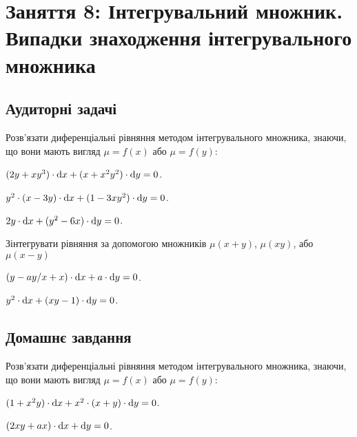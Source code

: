 \section*{Заняття 8: Інтегрувальний множник. Випадки знаходження інтегрувального множника}

\subsection*{Аудиторні задачі}

Розв'язати диференціальні рівняння методом інтегрувального множника, знаючи, що вони мають вигляд $\mu = f(x)$ або $\mu = f(y)$:

\begin{problem}
	$(2 y + x y^3) \cdot \mathop{}\!\mathrm{d} x + (x + x^2 y^2) \cdot \mathop{}\!\mathrm{d} y = 0$.
\end{problem}

\begin{problem}
	$y^2 \cdot (x - 3 y) \cdot \mathop{}\!\mathrm{d} x + (1 - 3 x y^2) \cdot \mathop{}\!\mathrm{d} y = 0$.
\end{problem}

\begin{problem}
	$2 y \cdot \mathop{}\!\mathrm{d} x + (y^2 - 6 x) \cdot \mathop{}\!\mathrm{d} y = 0$.
\end{problem}

Зінтегрувати рівняння за допомогою множників $\mu(x + y)$, $\mu(x y)$, або $\mu(x - y)$

\begin{problem}
	$(y - a y / x + x) \cdot \mathop{}\!\mathrm{d} x + a \cdot \mathop{}\!\mathrm{d} y = 0$.
\end{problem}

\begin{problem}
	$y^2 \cdot \mathop{}\!\mathrm{d} x + (x y - 1) \cdot \mathop{}\!\mathrm{d} y = 0$.
\end{problem}

\subsection*{Домашнє завдання}

Розв'язати диференціальні рівняння методом інтегрувального множника, знаючи, що вони мають вигляд $\mu = f(x)$ або $\mu = f(y)$:

\begin{problem}
	$(1 + x^2 y) \cdot \mathop{}\!\mathrm{d} x + x^2 \cdot (x + y) \cdot \mathop{}\!\mathrm{d} y = 0$.
\end{problem}

\begin{problem}
	$(2 x y + a x) \cdot \mathop{}\!\mathrm{d} x + \mathop{}\!\mathrm{d} y = 0$.
\end{problem}

